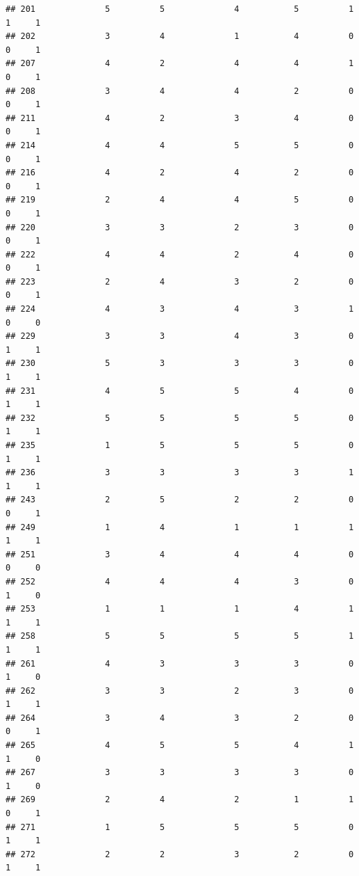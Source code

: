 \documentclass[
]{article}
\begin{document}
\begin{verbatim}
## 201              5          5              4           5          1    1     1
## 202              3          4              1           4          0    0     1
## 207              4          2              4           4          1    0     1
## 208              3          4              4           2          0    0     1
## 211              4          2              3           4          0    0     1
## 214              4          4              5           5          0    0     1
## 216              4          2              4           2          0    0     1
## 219              2          4              4           5          0    0     1
## 220              3          3              2           3          0    0     1
## 222              4          4              2           4          0    0     1
## 223              2          4              3           2          0    0     1
## 224              4          3              4           3          1    0     0
## 229              3          3              4           3          0    1     1
## 230              5          3              3           3          0    1     1
## 231              4          5              5           4          0    1     1
## 232              5          5              5           5          0    1     1
## 235              1          5              5           5          0    1     1
## 236              3          3              3           3          1    1     1
## 243              2          5              2           2          0    0     1
## 249              1          4              1           1          1    1     1
## 251              3          4              4           4          0    0     0
## 252              4          4              4           3          0    1     0
## 253              1          1              1           4          1    1     1
## 258              5          5              5           5          1    1     1
## 261              4          3              3           3          0    1     0
## 262              3          3              2           3          0    1     1
## 264              3          4              3           2          0    0     1
## 265              4          5              5           4          1    1     0
## 267              3          3              3           3          0    1     0
## 269              2          4              2           1          1    0     1
## 271              1          5              5           5          0    1     1
## 272              2          2              3           2          0    1     1

\end{verbatim}
\end{document}
